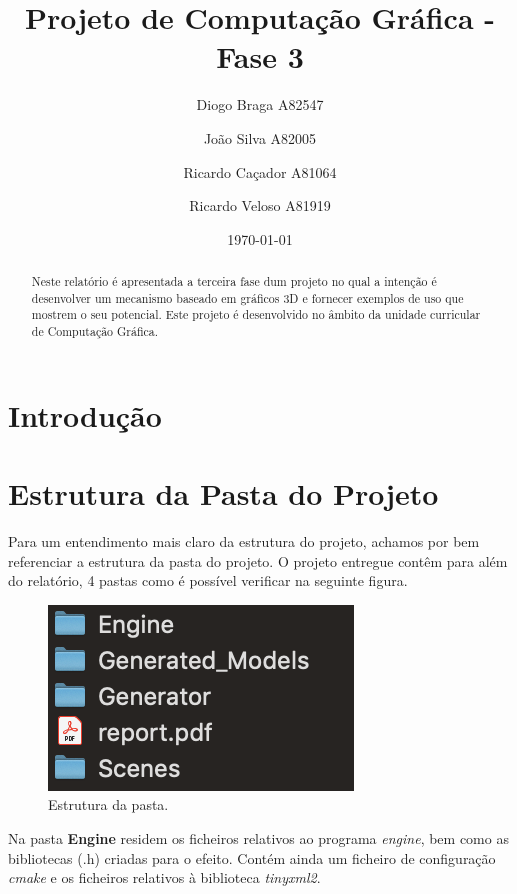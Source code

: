 \documentclass[a4paper]{article}
\title{Projeto de Computação Gráfica - Fase 3}
\author{Diogo Braga A82547 \and João Silva A82005 \and Ricardo Caçador A81064
\and Ricardo Veloso A81919}
\date{\today}
\begin{document}
\maketitle

\begin{abstract}
Neste relatório é apresentada a terceira fase dum projeto no qual a intenção é desenvolver um mecanismo baseado em gráficos 3D e fornecer exemplos de uso que mostrem o seu potencial. Este projeto é desenvolvido no âmbito da unidade curricular de Computação Gráfica.
\end{abstract}


\newpage

\tableofcontents


\newpage

\section{Introdução}
\label{sec:intro}


\newpage

\section{Estrutura da Pasta do Projeto}
\label{sec:estrutura}

Para um entendimento mais claro da estrutura do projeto, achamos por bem referenciar a estrutura da pasta do projeto.
O projeto entregue contêm para além do relatório, 4 pastas como é possível verificar na seguinte figura.

\begin{figure}[H]
\centering
\includegraphics[scale=1.0]{estrutura.png}
\caption{Estrutura da pasta.}
\label{img:estrutura}
\end{figure}

Na pasta \textbf{Engine} residem os ficheiros relativos ao programa \emph{engine}, bem como as bibliotecas (.h) criadas para o efeito. Contém ainda um ficheiro de configuração \emph{cmake} e os ficheiros relativos à biblioteca \emph{tinyxml2}.
\end{document}
